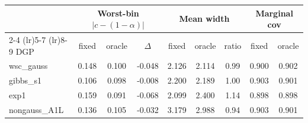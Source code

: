 \begin{tabular}{l ccc ccc cc}
\toprule
 & \multicolumn{3}{c}{Worst-bin $|c-(1-\alpha)|$} & \multicolumn{3}{c}{Mean width} & \multicolumn{2}{c}{Marginal cov} \\
\cmidrule(lr){2-4} \cmidrule(lr){5-7} \cmidrule(lr){8-9}
DGP & fixed & oracle & $\Delta$ & fixed & oracle & ratio & fixed & oracle \\
\midrule
wsc\_gauss & 0.148 & 0.100 & -0.048 & 2.126 & 2.114 & 0.99 & 0.900 & 0.902 \\
gibbs\_s1 & 0.106 & 0.098 & -0.008 & 2.200 & 2.189 & 1.00 & 0.903 & 0.901 \\
exp1 & 0.159 & 0.091 & -0.068 & 2.099 & 2.400 & 1.14 & 0.898 & 0.898 \\
nongauss\_A1L & 0.136 & 0.105 & -0.032 & 3.179 & 2.988 & 0.94 & 0.903 & 0.901 \\
\bottomrule
\end{tabular}

